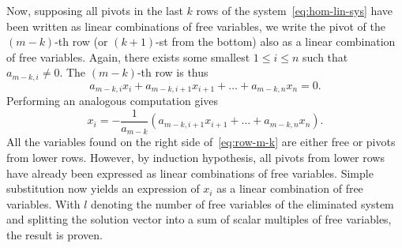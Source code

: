 \begin{propproof}
 Now, supposing all pivots in the last $k$ rows of the
 system~\eqref{eq:hom-lin-sys} have been written as linear combinations of free
 variables, we write the pivot of the $(m-k)$-th row (or $(k+1)$-st from the
 bottom) also as a linear combination of free variables. Again, there exists
 some smallest $1 \leq i \leq n$ such that $a_{m-k,i} \neq 0$. The $(m-k)$-th
 row is thus
 \[
  a_{m-k,i}x_i + a_{m-k,i+1}x_{i+1} + \ldots + a_{m-k,n}x_n = 0.
 \]
 Performing an analogous computation gives
 \begin{equation}
  \label{eq:row-m-k}
  x_i = - \frac{1}{a_{m-k}}(a_{m-k,i+1}x_{i+1} + \ldots + a_{m-k,n}x_n).
 \end{equation}
 All the variables found on the right side of~\eqref{eq:row-m-k} are either free
 or pivots from lower rows. However, by induction hypothesis, all pivots from
 lower rows have already been expressed as linear combinations of free
 variables. Simple substitution now yields an expression of $x_i$ as a linear
 combination of free variables. With $l$ denoting the number of free variables
 of the eliminated system and splitting the solution vector into a sum of scalar
 multiples of free variables, the result is proven.
\end{propproof}


